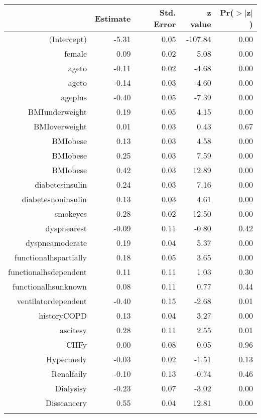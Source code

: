 \bigskip\bigskip
\centering
\begin{tabular}{rrrrr}
  \hline
 & Estimate & Std. Error & z value & Pr($>$$|$z$|$) \\ 
  \hline
(Intercept) & -5.31 & 0.05 & -107.84 & 0.00 \\ 
  female & 0.09 & 0.02 & 5.08 & 0.00 \\ 
  age\-65\-to\-74 & -0.11 & 0.02 & -4.68 & 0.00 \\ 
  age\-75\-to\-84 & -0.14 & 0.03 & -4.60 & 0.00 \\ 
  age\-85\-plus & -0.40 & 0.05 & -7.39 & 0.00 \\ 
  BMI\-underweight & 0.19 & 0.05 & 4.15 & 0.00 \\ 
  BMI\-overweight & 0.01 & 0.03 & 0.43 & 0.67 \\ 
  BMI\-obese\-1 & 0.13 & 0.03 & 4.58 & 0.00 \\ 
  BMI\-obese\-2 & 0.25 & 0.03 & 7.59 & 0.00 \\ 
  BMI\-obese\-3 & 0.42 & 0.03 & 12.89 & 0.00 \\ 
  diabetes\-insulin & 0.24 & 0.03 & 7.16 & 0.00 \\ 
  diabetes\-noninsulin & 0.13 & 0.03 & 4.61 & 0.00 \\ 
  smoke\-yes & 0.28 & 0.02 & 12.50 & 0.00 \\ 
  dyspnea\-rest & -0.09 & 0.11 & -0.80 & 0.42 \\ 
  dyspnea\-moderate & 0.19 & 0.04 & 5.37 & 0.00 \\ 
  functional\-hs\-partially & 0.18 & 0.05 & 3.65 & 0.00 \\ 
  functional\-hs\-dependent & 0.11 & 0.11 & 1.03 & 0.30 \\ 
  functional\-hs\-unknown & 0.08 & 0.11 & 0.77 & 0.44 \\ 
  ventilator\-dependent & -0.40 & 0.15 & -2.68 & 0.01 \\ 
  history\-COPD & 0.13 & 0.04 & 3.27 & 0.00 \\ 
  ascites\-y & 0.28 & 0.11 & 2.55 & 0.01 \\ 
  CHF\-y & 0.00 & 0.08 & 0.05 & 0.96 \\ 
  Hyper\-med\-y & -0.03 & 0.02 & -1.51 & 0.13 \\ 
  Renal\-fail\-y & -0.10 & 0.13 & -0.74 & 0.46 \\ 
  Dialysis\-y & -0.23 & 0.07 & -3.02 & 0.00 \\ 
  Diss\-cancer\-y & 0.55 & 0.04 & 12.81 & 0.00 \\ 
$$
\end{tabular}
